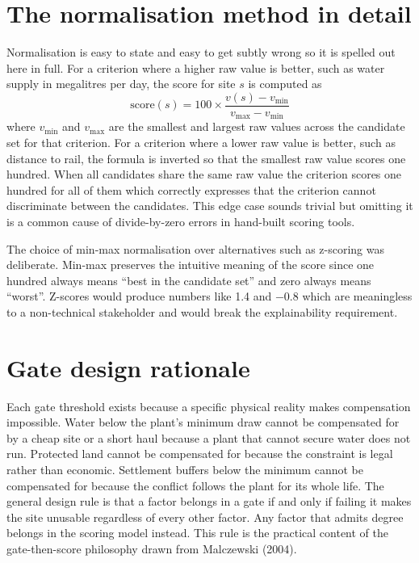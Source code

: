 \documentclass[12pt,a4paper]{report}
\begin{document}
\section{The normalisation method in detail}
Normalisation is easy to state and easy to get subtly wrong so it is
spelled out here in full. For a criterion where a higher raw value is
better, such as water supply in megalitres per day, the score for site
$s$ is computed as
\[
\text{score}(s) = 100 \times
\frac{v(s) - v_{\min}}{v_{\max} - v_{\min}}
\]
where $v_{\min}$ and $v_{\max}$ are the smallest and largest raw
values across the candidate set for that criterion. For a criterion
where a lower raw value is better, such as distance to rail, the
formula is inverted so that the smallest raw value scores one hundred.
When all candidates share the same raw value the criterion scores one
hundred for all of them which correctly expresses that the criterion
cannot discriminate between the candidates. This edge case sounds
trivial but omitting it is a common cause of divide-by-zero errors in
hand-built scoring tools.

The choice of min-max normalisation over alternatives such as
z-scoring was deliberate. Min-max preserves the intuitive meaning of
the score since one hundred always means ``best in the candidate set''
and zero always means ``worst''. Z-scores would produce numbers like
1.4 and $-0.8$ which are meaningless to a non-technical stakeholder
and would break the explainability requirement.

\section{Gate design rationale}
Each gate threshold exists because a specific physical reality makes
compensation impossible. Water below the plant's minimum draw cannot
be compensated for by a cheap site or a short haul because a plant
that cannot secure water does not run. Protected land cannot be
compensated for because the constraint is legal rather than economic.
Settlement buffers below the minimum cannot be compensated for because
the conflict follows the plant for its whole life. The general design
rule is that a factor belongs in a gate if and only if failing it
makes the site unusable regardless of every other factor. Any factor
that admits degree belongs in the scoring model instead. This rule is
the practical content of the gate-then-score philosophy drawn from
Malczewski (2004).
\end{document}
